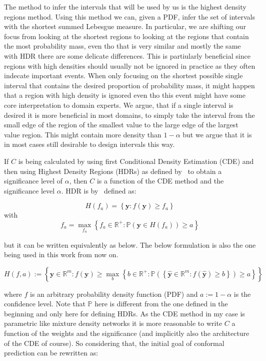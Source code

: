 The method to infer the intervals that will be used by us is the highest density regions method. Using this method we can, given a PDF, infer the set of intervals with the shortest summed Lebesgue measure. In particular, we are shifting our focus from looking at the shortest regions to looking at the regions that contain the most probability mass, even tho that is very similar and mostly the same with HDR there are some delicate differences. This is partiularly beneficial since regions with high densities should usually not be ignored in practice as they often indecate important events. When only focusing on the shortest possible single interval that contains the desired proportion of probability mass, it might happen that a region with high density is ignored even tho this event might have some core interpretation to domain experts. We argue, that if a single interval is desired it is more beneficial in most domains, to simply take the interval from the small edge of the region of the smallest value to the large edge of the largest value region. This might contain more density than $1 - \alpha$ but we argue that it is in most cases still desirable to design intervals this way. %

If $C$ is being calculated by using first Conditional Density Estimation (CDE) and then using Highest Density Regions (HDRs) as defined by~\cite{hyndman1996computing} to obtain a significance level of $\alpha$, then $C$ is a function of the CDE method and the significance level $\alpha$. HDR is by~\cite{hyndman1996computing} defined as:

\[
    H\left(f_a\right)=\left\{\mathbf{y}: f(\mathbf{y}) \geq f_a\right\}
\]
with
\[
    f_a = \max_{f_a} \left\{f_a \in \mathbb{R^+}: \mathbb{P}\left(\mathbf{y}
    \in
    H(f_a)\right) \geq a \right\}
\]

but it can be written equivalently as below. The below formulation is also the one being used in this work from now on.

\begin{equation}
    H\left(f, a\right):=\left\{\mathbf{y} \in \mathbb{R}^m: f(\mathbf{y}) \geq
    \max_{b} \left\{b \in \mathbb{R^+}: \mathbb{P}\left(\left\{\mathbf{\hat{y}}
    \in
    \mathbb{R}^m: f(\mathbf{\hat{y}}) \geq b\right\}\right) \geq a
    \right\}\right\}
    \label{eq:HDR}
\end{equation}

where $f$ is an arbitrary probability density function (PDF) and $a := 1 - \alpha$ is the confidence level. Note that $\mathbb{P}$ here is different from the one defined in the beginning and only here for defining HDRs. As the CDE method in my case is parametric like mixture density networks it is more reasonable to write $C$ a function of the weights and the significance (and implicitly also the architecture of the CDE of course). So considering that, the initial goal of conformal prediction can be rewritten as:

